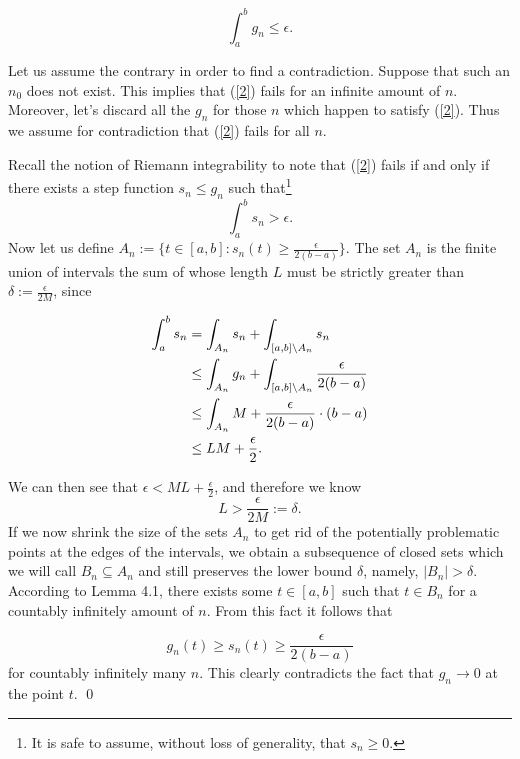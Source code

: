 \documentclass[12pt]{article}
\begin{document}
\begin{equation}
\label{2}
    \int_a^bg_n\leq \epsilon.
\end{equation}

\noindent Let us assume the contrary in order to find a contradiction. Suppose that such an $n_0$ does not exist. This implies that (\ref{2}) fails for an infinite amount of $n$. Moreover, let's discard all the $g_n$ for those $n$ which happen to satisfy (\ref{2}). Thus we assume for contradiction that (\ref{2}) fails for all $n$.

\vspace{2mm}

\noindent Recall the notion of Riemann integrability to note that (\ref{2}) fails if and only if there exists a step function $s_n\leq g_n$ such that\footnote{It is safe to assume, without loss of generality, that $s_n\geq 0$.} $$\int_a^bs_n>\epsilon.$$ Now let us define $A_n:=\{t\in[a,b]:s_n(t)\geq\frac{\epsilon}{2(b-a)}\}$. The set $A_n$ is the finite union of intervals the sum of whose length $L$ must be strictly greater than $\delta:=\frac{\epsilon}{2M}$, since 

\begin{align*}
    \int_a^bs_n&=\int_{A_n}s_n+\int_{[a,b]\setminus A_n}s_n\hspace{1mm}\\
    &\leq \int_{A_n}g_n+\int_{[a,b]\setminus A_n}\frac{\epsilon}{2(b-a)}\\
    &\leq\int_{A_n}M+\frac{\epsilon}{2(b-a)}\cdot(b-a)\\
    &\leq LM+\frac{\epsilon}{2}.
\end{align*}

\vspace{2mm}

\noindent We can then see that $\epsilon<ML+\frac{\epsilon}{2}$, and therefore we know $$L>\frac{\epsilon}{2M}:=\delta.$$ If we now shrink the size of the sets $A_n$ to get rid of the potentially problematic points at the edges of the intervals, we obtain a subsequence of closed sets which we will call $B_n\subseteq A_n$ and still preserves the lower bound $\delta$, namely, $|B_n|>\delta$. According to Lemma 4.1, there exists some $t\in[a,b]$ such that $t\in B_n$ for a countably infinitely amount of $n$. From this fact it follows that 

\vspace{2mm}

$$g_n(t)\geq s_n(t)\geq \frac{\epsilon}{2(b-a)}$$ for countably infinitely many $n$. This clearly contradicts the fact that $g_n\to 0$ at the point $t$.
\qed
\end{document}
